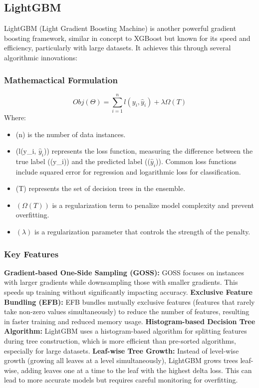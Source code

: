 \documentclass{ieeeojies}
\begin{document}
\subsection{LightGBM}
LightGBM (Light Gradient Boosting Machine) is another powerful gradient boosting framework, similar in concept to XGBoost but known for its speed and efficiency, particularly with large datasets. It achieves this through several algorithmic innovations:
\subsubsection{Mathemactical Formulation}
\begin{dmath*}
    Obj(\Theta) = \sum_{i=1}^n l(y_i, \hat{y}_i) + \lambda \Omega(T)
\end{dmath*}
Where:
\begin{itemize}
    \item (n) is the number of data instances.\\
    \item (l(y_i, \(\hat{y}_i\))) represents the loss function, measuring the difference between the true label ((y_i)) and the predicted label ((\(\hat{y}_i\))). Common loss functions include squared error for regression and logarithmic loss for classification.
    \item (T) represents the set of decision trees in the ensemble.\\
    \item $(\Omega(T))$ is a regularization term to penalize model complexity and prevent overfitting.\\
    \item $ (\lambda) $ is a regularization parameter that controls the strength of the penalty.
\end{itemize}
\subsubsection{Key Features}
\textbf{Gradient-based One-Side Sampling (GOSS):} GOSS focuses on instances with larger gradients while downsampling those with smaller gradients. This speeds up training without significantly impacting accuracy.
\textbf{Exclusive Feature Bundling (EFB):} EFB bundles mutually exclusive features (features that rarely take non-zero values simultaneously) to reduce the number of features, resulting in faster training and reduced memory usage.
\textbf{Histogram-based Decision Tree Algorithm:} LightGBM uses a histogram-based algorithm for splitting features during tree construction, which is more efficient than pre-sorted algorithms, especially for large datasets.
\textbf{Leaf-wise Tree Growth:} Instead of level-wise growth (growing all leaves at a level simultaneously), LightGBM grows trees leaf-wise, adding leaves one at a time to the leaf with the highest delta loss. This can lead to more accurate models but requires careful monitoring for overfitting.
\end{document}
